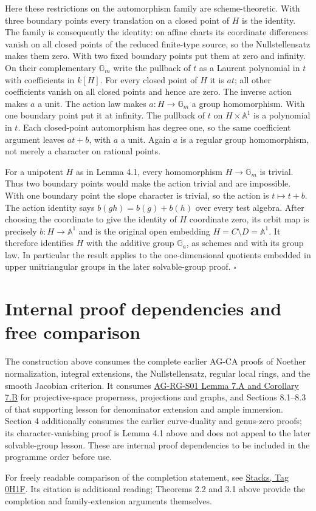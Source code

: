 \documentclass[11pt,a4paper,openany]{report}
\begin{document}
Here these restrictions on the automorphism family are scheme-theoretic. With three boundary points every translation on a closed point of \(H\) is the identity. The family is consequently the identity: on affine charts its coordinate differences vanish on all closed points of the reduced finite-type source, so the Nullstellensatz makes them zero. With two fixed boundary points put them at zero and infinity. On their complementary \(\mathbb G_m\) write the pullback of \(t\) as a Laurent polynomial in \(t\) with coefficients in \(k[H]\). For every closed point of \(H\) it is \(a t\); all other coefficients vanish on all closed points and hence are zero. The inverse action makes \(a\) a unit. The action law makes \(a:H\to\mathbb G_m\) a group homomorphism. With one boundary point put it at infinity. The pullback of \(t\) on \(H\times\mathbb A^1\) is a polynomial in \(t\). Each closed-point automorphism has degree one, so the same coefficient argument leaves \(a t+b\), with \(a\) a unit. Again \(a\) is a regular group homomorphism, not merely a character on rational points.

For a unipotent \(H\) as in Lemma 4.1, every homomorphism \(H\to\mathbb G_m\) is trivial. Thus two boundary points would make the action trivial and are impossible. With one boundary point the slope character is trivial, so the action is \(t\mapsto t+b\). The action identity says \(b(gh)=b(g)+b(h)\) over every test algebra. After choosing the coordinate to give the identity of \(H\) coordinate zero, its orbit map is precisely \(b:H\to\mathbb A^1\) and is the original open embedding \(H=C\setminus D=\mathbb A^1\). It therefore identifies \(H\) with the additive group \(\mathbb G_a\), as schemes and with its group law. In particular the result applies to the one-dimensional quotients embedded in upper unitriangular groups in the later solvable-group proof. \(\square\)

\section{Internal proof dependencies and free comparison}\label{AG-RG-S03-internal-proof-dependencies-and-free-comparison}

The construction above consumes the complete earlier AG-CA proofs of Noether normalization, integral extensions, the Nullstellensatz, regular local rings, and the smooth Jacobian criterion. It consumes \href{AG-RG-S01.html\#projective-properness}{AG-RG-S01 Lemma 7.A and Corollary 7.B} for projective-space properness, projections and graphs, and Sections 8.1--8.3 of that supporting lesson for denominator extension and ample immersion. Section 4 additionally consumes the earlier curve-duality and genus-zero proofs; its character-vanishing proof is Lemma 4.1 above and does not appeal to the later solvable-group lesson. These are internal proof dependencies to be included in the programme order before use.

For freely readable comparison of the completion statement, see \href{https://stacks.math.columbia.edu/tag/0H1F}{Stacks, Tag 0H1F}. Its citation is additional reading; Theorems 2.2 and 3.1 above provide the completion and family-extension arguments themselves.
\end{document}
